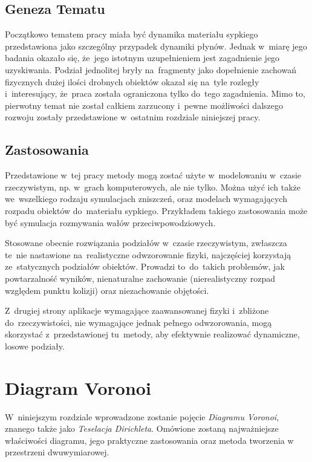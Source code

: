 \documentclass[skorowidz,autorrok,backref,xodstep,oswiadczenie]{wmimgr}
\begin{document}
\section{Geneza Tematu}

Początkowo tematem pracy miała być dynamika materiału sypkiego przedstawiona jako szczególny przypadek dynamiki płynów. Jednak w~miarę jego badania okazało się, że~jego istotnym uzupełnieniem jest zagadnienie jego uzyskiwania. Podział jednolitej bryły na~fragmenty jako dopełnienie zachowań fizycznych dużej ilości drobnych obiektów okazał się na~tyle rozległy i~interesujący, że~praca została ograniczona tylko do~tego zagadnienia. Mimo to, pierwotny temat nie został całkiem zarzucony i~pewne możliwości dalszego rozwoju zostały przedstawione w~ostatnim rozdziale niniejszej pracy.

\section{Zastosowania}

Przedstawione w~tej pracy metody mogą zostać użyte w~modelowaniu w~czasie rzeczywistym, np. w~grach komputerowych, ale nie tylko. Można użyć ich także we~wszelkiego rodzaju symulacjach zniszczeń, oraz modelach wymagających rozpadu obiektów do~materiału sypkiego. Przykładem takiego zastosowania może być symulacja rozmywania wałów przeciwpowodziowych.

Stosowane obecnie rozwiązania podziałów w~czasie rzeczywistym, zwłaszcza te~nie nastawione na~realistyczne odwzorowanie fizyki, najczęściej korzystają ze~statycznych podziałów obiektów. Prowadzi to~do~takich problemów, jak powtarzalność wyników, nienaturalne zachowanie (nierealistyczny rozpad względem punktu kolizji) oraz niezachowanie objętości.

Z~drugiej strony aplikacje wymagające zaawansowanej fizyki i~zbliżone do~rzeczywistości, nie wymagające jednak pełnego odwzorowania, mogą skorzystać z~przedstawionej tu~metody, aby efektywnie realizować dynamiczne, losowe podziały.

\chapter{Diagram Voronoi}

W~niniejszym rozdziale wprowadzone zostanie pojęcie \emph{Diagramu Voronoi}, znanego także jako \emph{Teselacja Dirichleta}. Omówione zostaną najważniejsze właściwości diagramu, jego praktyczne zastosowania oraz metoda tworzenia w przestrzeni dwuwymiarowej.
\end{document}
